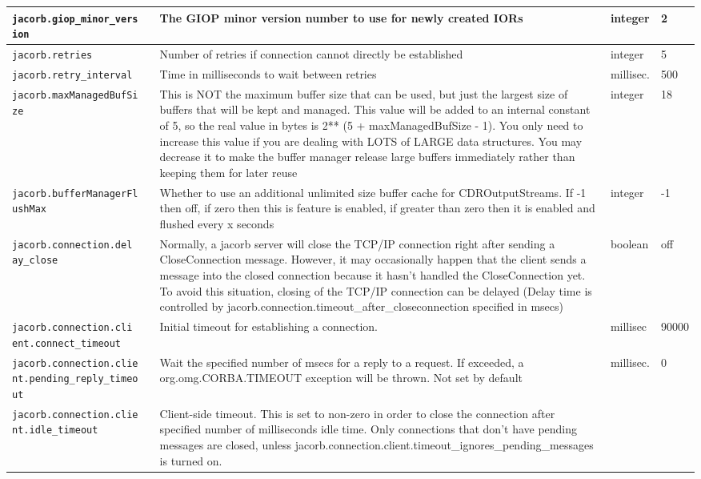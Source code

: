 {{\begin{small}
\begin{longtable}{|p{5cm}|p{7.5cm}|p{1.5cm}|p{1.5cm}|}
\verb"jacorb.giop_minor_vers"
\verb"ion" & The GIOP minor version number to use for newly created
IORs & integer & 2 \\
\hline
\verb"jacorb.retries" & Number of retries if connection cannot
directly be established & integer & 5 \\
\hline
\verb"jacorb.retry_interval" & Time in milliseconds to wait between
retries & millisec. & 500 \\
\hline
\verb"jacorb.maxManagedBufSi"
\verb"ze" & This is NOT the maximum buffer size that can be used, but
just the largest size of buffers that will be kept and managed. This
value will be added to an internal constant of 5, so the real value in
bytes is 2** (5 + maxManagedBufSize - 1). You only need to increase
this value if you are dealing with LOTS of LARGE data structures. You
may decrease it to make the buffer manager release large buffers
immediately rather than keeping them for later reuse & integer & 18 \\
\hline
\verb"jacorb.bufferManagerFl"
\verb"ushMax" & Whether to use an additional unlimited size buffer
cache for CDROutputStreams. If -1 then off, if zero then this is
feature is enabled, if greater than zero then it is enabled and
flushed every x seconds & integer & -1 \\
\hline
\verb"jacorb.connection.del"
\verb"ay_close" & Normally, a jacorb server will close the TCP/IP connection
right after sending a CloseConnection message. However, it may occasionally
happen that the client sends a message into the closed connection because
it hasn't handled the CloseConnection yet. To avoid this situation, closing
of the TCP/IP connection can be delayed (Delay time is controlled by
jacorb.connection.timeout\_after\_closeconnection specified in msecs) &
boolean & off \\
\hline
\verb"jacorb.connection.cli"
\verb"ent.connect_timeout" & Initial timeout for establishing a connection.
 & millisec & 90000 \\
\hline
\verb"jacorb.connection.clie"
\verb"nt.pending_reply_timeo"
\verb"ut" &  Wait the specified number of msecs for a reply to a
request. If exceeded, a org.omg.CORBA.TIMEOUT exception will be
thrown. Not set by default & millisec. & 0  \\
\hline
\verb"jacorb.connection.clie"
\verb"nt.idle_timeout" & Client-side timeout. This is set to non-zero in order
to close the connection after specified number of milliseconds idle time. Only
connections that don't have pending messages are closed, unless
jacorb.connection.client.timeout\_ignores\_pending\_messages is turned on. &

\end{longtable}
\end{small}}}
